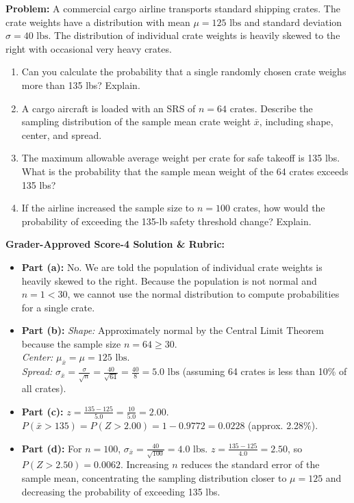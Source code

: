 \begin{frqrubricbox}
\textbf{Problem:} A commercial cargo airline transports standard shipping crates. The crate weights have a distribution with mean $\mu = 125\text{ lbs}$ and standard deviation $\sigma = 40\text{ lbs}$. The distribution of individual crate weights is heavily skewed to the right with occasional very heavy crates.
\begin{enumerate}[label=(\alph*)]
  \item Can you calculate the probability that a single randomly chosen crate weighs more than 135 lbs? Explain.
  \item A cargo aircraft is loaded with an SRS of $n = 64$ crates. Describe the sampling distribution of the sample mean crate weight $\bar{x}$, including shape, center, and spread.
  \item The maximum allowable average weight per crate for safe takeoff is 135 lbs. What is the probability that the sample mean weight of the 64 crates exceeds 135 lbs?
  \item If the airline increased the sample size to $n = 100$ crates, how would the probability of exceeding the 135-lb safety threshold change? Explain.
\end{enumerate}

\textbf{Grader-Approved Score-4 Solution \& Rubric:}
\begin{itemize}[leftmargin=1.2em]
  \item \textbf{Part (a):} No. We are told the population of individual crate weights is heavily skewed to the right. Because the population is not normal and $n = 1 < 30$, we cannot use the normal distribution to compute probabilities for a single crate.
  \item \textbf{Part (b):}
  \textit{Shape:} Approximately normal by the Central Limit Theorem because the sample size $n = 64 \ge 30$.\\
  \textit{Center:} $\mu_{\bar{x}} = \mu = 125\text{ lbs}$.\\
  \textit{Spread:} $\sigma_{\bar{x}} = \frac{\sigma}{\sqrt{n}} = \frac{40}{\sqrt{64}} = \frac{40}{8} = 5.0\text{ lbs}$ (assuming 64 crates is less than 10\% of all crates).
  \item \textbf{Part (c):} $z = \frac{135 - 125}{5.0} = \frac{10}{5.0} = 2.00$.\\
  $P(\bar{x} > 135) = P(Z > 2.00) = 1 - 0.9772 = \mathbf{0.0228}$ (approx. 2.28\%).
  \item \textbf{Part (d):} For $n = 100$, $\sigma_{\bar{x}} = \frac{40}{\sqrt{100}} = 4.0\text{ lbs}$.
  $z = \frac{135 - 125}{4.0} = 2.50$, so $P(Z > 2.50) = 0.0062$.
  Increasing $n$ reduces the standard error of the sample mean, concentrating the sampling distribution closer to $\mu = 125$ and decreasing the probability of exceeding 135 lbs.
\end{itemize}
\end{frqrubricbox}

